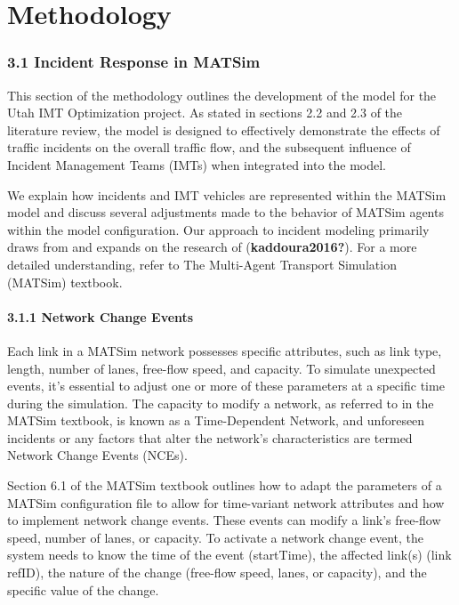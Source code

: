 \documentclass[
  letterpaper,
  DIV=11,
  numbers=noendperiod]{scrreprt}
\begin{document}

\hypertarget{methodology}{%
\chapter{Methodology}\label{methodology}}

\hypertarget{incident-response-in-matsim}{%
\subsection{3.1 Incident Response in
MATSim}\label{incident-response-in-matsim}}

This section of the methodology outlines the development of the model
for the Utah IMT Optimization project. As stated in sections 2.2 and 2.3
of the literature review, the model is designed to effectively
demonstrate the effects of traffic incidents on the overall traffic
flow, and the subsequent influence of Incident Management Teams (IMTs)
when integrated into the model.

We explain how incidents and IMT vehicles are represented within the
MATSim model and discuss several adjustments made to the behavior of
MATSim agents within the model configuration. Our approach to incident
modeling primarily draws from and expands on the research of
(\textbf{kaddoura2016?}). For a more detailed understanding, refer to
The Multi-Agent Transport Simulation (MATSim) textbook.

\hypertarget{network-change-events}{%
\subsubsection{3.1.1 Network Change
Events}\label{network-change-events}}

Each link in a MATSim network possesses specific attributes, such as
link type, length, number of lanes, free-flow speed, and capacity. To
simulate unexpected events, it's essential to adjust one or more of
these parameters at a specific time during the simulation. The capacity
to modify a network, as referred to in the MATSim textbook, is known as
a Time-Dependent Network, and unforeseen incidents or any factors that
alter the network's characteristics are termed Network Change Events
(NCEs).

Section 6.1 of the MATSim textbook outlines how to adapt the parameters
of a MATSim configuration file to allow for time-variant network
attributes and how to implement network change events. These events can
modify a link's free-flow speed, number of lanes, or capacity. To
activate a network change event, the system needs to know the time of
the event (startTime), the affected link(s) (link refID), the nature of
the change (free-flow speed, lanes, or capacity), and the specific value
of the change.
\end{document}
